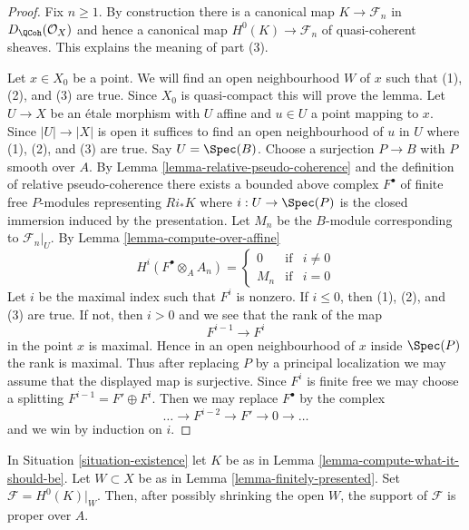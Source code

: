 \begin{proof}
Fix $n \geq 1$. By construction there is a canonical map
$K \to \mathcal{F}_n$ in $D_\QCoh(\mathcal{O}_X)$
and hence a canonical map $H^0(K) \to \mathcal{F}_n$
of quasi-coherent sheaves. This explains the meaning of part (3).

\medskip\noindent
Let $x \in X_0$ be a point. We will find an open neighbourhood $W$
of $x$ such that (1), (2), and (3) are true. Since $X_0$ is quasi-compact
this will prove the lemma. Let $U \to X$ be an \'etale morphism
with $U$ affine and $u \in U$ a point mapping to $x$. Since $|U| \to |X|$
is open it suffices to find an open neighbourhood of $u$ in $U$
where (1), (2), and (3) are true. Say $U = \Spec(B)$.
Choose a surjection $P \to B$ with $P$ smooth over $A$.
By Lemma \ref{lemma-relative-pseudo-coherence}
and the definition of relative pseudo-coherence
there exists a bounded above complex $F^\bullet$
of finite free $P$-modules representing
$Ri_*K$ where $i : U \to \Spec(P)$ is the closed
immersion induced by the presentation.
Let $M_n$ be the $B$-module corresponding to $\mathcal{F}_n|_U$.
By Lemma \ref{lemma-compute-over-affine}
$$
H^i(F^\bullet \otimes_A A_n) =
\left\{
\begin{matrix}
0 & \text{if} & i \not = 0 \\
M_n & \text{if} & i = 0
\end{matrix}
\right.
$$
Let $i$ be the maximal index such that $F^i$ is nonzero.
If $i \leq 0$, then (1), (2), and (3) are true.
If not, then $i > 0$ and we see that the rank of the map
$$
F^{i - 1} \to F^i
$$
in the point $x$ is maximal. Hence in an open neighbourhood
of $x$ inside $\Spec(P)$ the rank is maximal. Thus after replacing
$P$ by a principal localization we may assume that the displayed
map is surjective. Since $F^i$ is finite free we may choose
a splitting $F^{i - 1} = F' \oplus F^i$. Then we may
replace $F^\bullet$ by the complex
$$
\ldots \to F^{i - 2} \to F' \to 0 \to \ldots
$$
and we win by induction on $i$.
\end{proof}

\begin{lemma}
\label{lemma-proper-support}
In Situation \ref{situation-existence} let $K$ be as in
Lemma \ref{lemma-compute-what-it-should-be}. Let $W \subset X$
be as in Lemma \ref{lemma-finitely-presented}.
Set $\mathcal{F} = H^0(K)|_W$. Then, after possibly shrinking the open $W$,
the support of $\mathcal{F}$ is proper over $A$.
\end{lemma}


